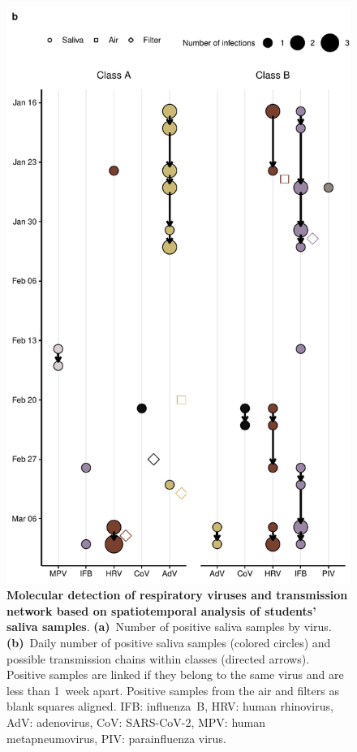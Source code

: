 \documentclass[fleqn,11pt]{wlscirep}
\begin{document}
\begin{figure}[!htpb]
    \includegraphics{../../results/mol-data/network-plot.pdf}
    \caption{\textbf{Molecular detection of respiratory viruses and transmission network based on spatiotemporal analysis of students' saliva samples}. \textbf{(a)}~Number of positive saliva samples by virus. \textbf{(b)}~Daily number of positive saliva samples (colored circles) and possible transmission chains within classes (directed arrows). Positive samples are linked if they belong to the same virus and are less than 1~week apart. Positive samples from the air and filters as blank squares aligned. IFB: influenza~B, HRV: human rhinovirus, AdV: adenovirus, CoV: SARS-CoV-2, MPV: human metapneumovirus, PIV: parainfluenza virus.}
    \label{fig:molecular-descriptives}
\end{figure}
\end{document}
